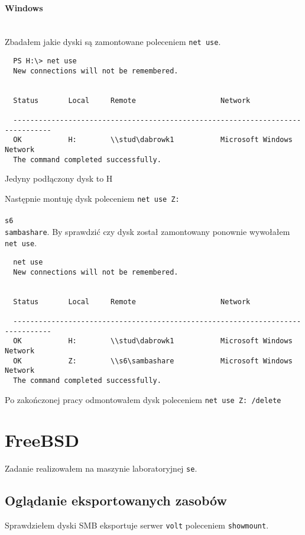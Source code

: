 \documentclass{article} %
\begin{document}
\paragraph{Windows} \mbox{} \\
Zbadałem jakie dyski są zamontowane poleceniem \texttt{net use}.
\begin{verbatim}
  PS H:\> net use
  New connections will not be remembered.


  Status       Local     Remote                    Network

  -------------------------------------------------------------------------------
  OK           H:        \\stud\dabrowk1           Microsoft Windows Network
  The command completed successfully.
\end{verbatim}
Jedyny podłączony dysk to H

Następnie montuję dysk poleceniem \texttt{net use Z: \\\\s6\\sambashare}.
By sprawdzić czy dysk został zamontowany ponownie wywołałem \texttt{net use}.
\begin{verbatim}
  net use
  New connections will not be remembered.


  Status       Local     Remote                    Network

  -------------------------------------------------------------------------------
  OK           H:        \\stud\dabrowk1           Microsoft Windows Network
  OK           Z:        \\s6\sambashare           Microsoft Windows Network
  The command completed successfully.
\end{verbatim}

Po zakończonej pracy odmontowałem dysk poleceniem \texttt{net use Z: /delete}

\section{FreeBSD}
Zadanie realizowałem na maszynie laboratoryjnej \texttt{se}.

\subsection{Oglądanie eksportowanych zasobów}
Sprawdziełem dyski SMB eksportuje serwer \texttt{volt} poleceniem \texttt{showmount}.
\end{document}
